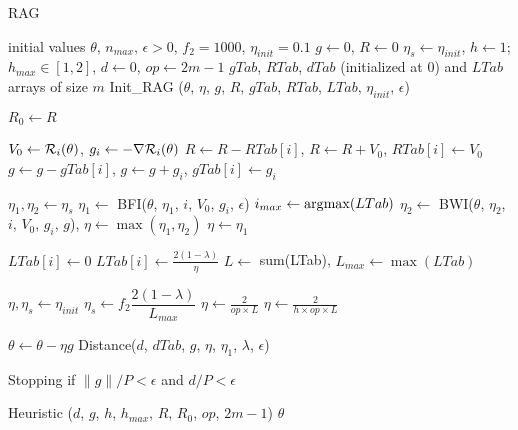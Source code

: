 \begin{algorithm}[h!]
	\caption{RAG}
	\label{algo_RAG}
	\begin{algorithmic}[1]
                \REQUIRE initial values $\theta$, $n_{max}$, $\epsilon>0$,  $f_2=1000$, $\eta_{init}=0.1$ 
                \STATE \newG{$\theta_0 \leftarrow \theta$,} $g \leftarrow 0$, $R \leftarrow 0$
		\STATE $\eta_s \leftarrow \eta_{init}$, $h\leftarrow 1$; $h_{max}\in [1,2]$, $d\leftarrow 0$, $op\leftarrow 2m-1$
		\STATE $gTab$, $RTab$, $dTab$ (initialized at 0) and $LTab$ arrays of size $m$
		\STATE Init\_RAG ($\theta$, $\eta$, $g$, $R$, $gTab$, $RTab$, $LTab$, $\eta_{init}$, $\epsilon$)
		
		\STATE $R_0 \leftarrow R$
		
		
		\STATE $V_0 \leftarrow \mathcal{R}_i(\theta)$, $g_i \leftarrow -\nabla \mathcal{R}_i(\theta)$
		\STATE $R \leftarrow R-RTab[i]$, $R \leftarrow R+V_0$, $RTab[i] \leftarrow V_0$
		\STATE $g\leftarrow g-gTab[i]$, $g \leftarrow g+g_i$, $gTab[i] \leftarrow g_i$
		
		\STATE $\eta_1, \eta_2 \leftarrow \eta_s$
		\STATE $\eta_1 \leftarrow$ BFI($\theta$, $\eta_1$, $i$, $V_0$, $g_i$, $\epsilon$)
		\STATE $i_{max} \leftarrow \operatorname*{\arg\!\max}(LTab)$
		\STATE $\eta_2 \leftarrow$ BWI($\theta$, $\eta_2$, $i$, $V_0$, $g_i$, $g$), \STATE $\eta \leftarrow \max(\eta_1,\eta_2)$
		\ELSE
		\STATE $\eta \leftarrow \eta_1$
		\ENDIF
		
		\STATE $LTab[i] \leftarrow 0$
		\ELSE
		\STATE $LTab[i] \leftarrow \frac{2(1-\lambda)}{\eta}$
		\ENDIF
		\STATE $L \leftarrow$ sum(LTab), $L_{max} \leftarrow \max(LTab)$
		
		\STATE $\eta,\eta_s \leftarrow \eta_{init}$
		\ELSE
		\STATE $\eta_s \leftarrow f_2\dfrac{2(1-\lambda)}{L_{max}}$
		\STATE $\eta \leftarrow \frac{2}{op \times L}$
		\ELSE
		\STATE $\eta \leftarrow \frac{2}{h \times op \times L}$
		\ENDIF
		\ENDIF
		
		\STATE $\theta \leftarrow \theta - \eta g$
		\STATE Distance($d$, $dTab$, $g$, $\eta$, $\eta_1$, $\lambda$, $\epsilon$)
		
		\STATE Stopping if $\|g\|/P<\epsilon$ and $d/P<\epsilon$
		
		\ENDFOR
		\STATE Heuristic ($d$, $g$, $h$, $h_{max}$, $R$, $R_0$, $op$, $2m-1$)
		\ENDWHILE
		\RETURN $\theta$
	\end{algorithmic}
\end{algorithm} 


